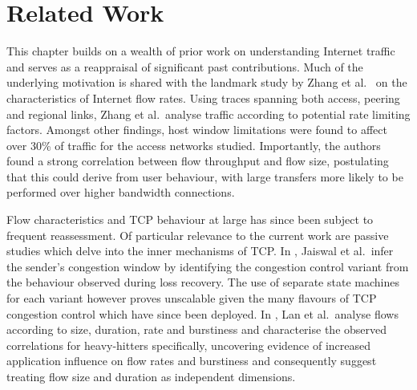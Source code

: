 \section{Related Work}
\label{section:malawi:related}

This chapter builds on a wealth of prior work on understanding Internet traffic and serves as a reappraisal of significant past contributions. 
Much of the underlying motivation is shared with the landmark study by Zhang et al.\ \cite{Zhang:2002p85} on the characteristics of Internet flow rates.
Using traces spanning both access, peering and regional links, Zhang et al.\ analyse traffic according to potential rate limiting factors.
Amongst other findings, host window limitations were found to affect over 30\% of traffic for the access networks studied.
Importantly, the authors found a strong correlation between flow throughput and flow size, postulating that this could derive from user behaviour, with large transfers more likely to be performed over higher bandwidth connections.

Flow characteristics and \ac{TCP} behaviour at large has since been subject to frequent reassessment.
Of particular relevance to the current work are passive studies which delve into the inner mechanisms of \ac{TCP}.
In \cite{Jaiswal:2004p242}, Jaiswal et al.\ infer the sender's congestion window by identifying the congestion control variant from the behaviour observed during loss recovery.
The use of separate state machines for each variant however proves unscalable given the many flavours of \ac{TCP} congestion control which have since been deployed.
In \cite{Lan:2006p566}, Lan et al.\ analyse flows according to size, duration, rate and burstiness and characterise the observed correlations for heavy-hitters specifically,
uncovering evidence of increased application influence on flow rates and burstiness and consequently suggest treating flow size and duration as independent dimensions.

